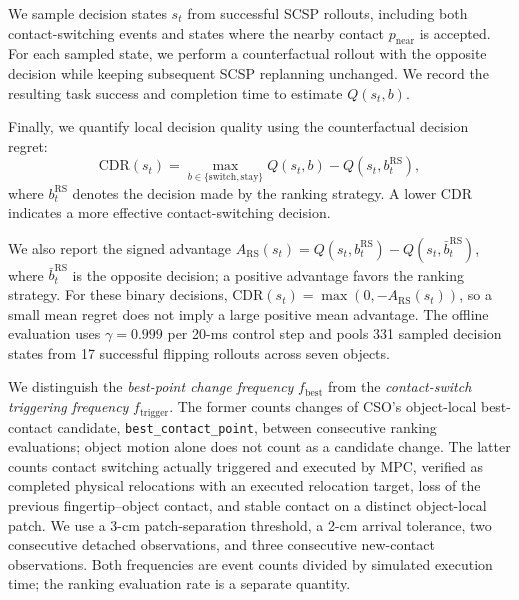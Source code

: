 We sample decision states $s_t$ from successful SCSP rollouts, including both contact-switching events and states where the nearby contact $p_{\mathrm{near}}$ is accepted. For each sampled state, we perform a counterfactual rollout with the opposite decision while keeping subsequent SCSP replanning unchanged. We record the resulting task success and completion time to estimate $Q(s_t,b)$.

Finally, we quantify local decision quality using the counterfactual decision regret:
\begin{equation}
\mathrm{CDR}(s_t)=
\max_{b\in\{\mathrm{switch},\mathrm{stay}\}}Q(s_t,b)
-Q(s_t,b_t^{\mathrm{RS}}),
\end{equation}
where $b_t^{\mathrm{RS}}$ denotes the decision made by the ranking strategy. A lower CDR indicates a more effective contact-switching decision.

We also report the signed advantage $A_{\mathrm{RS}}(s_t)=Q(s_t,b_t^{\mathrm{RS}})-Q(s_t,\bar b_t^{\mathrm{RS}})$, where $\bar b_t^{\mathrm{RS}}$ is the opposite decision; a positive advantage favors the ranking strategy. For these binary decisions, $\mathrm{CDR}(s_t)=\max(0,-A_{\mathrm{RS}}(s_t))$, so a small mean regret does not imply a large positive mean advantage. The offline evaluation uses $\gamma=0.999$ per 20-ms control step and pools 331 sampled decision states from 17 successful flipping rollouts across seven objects.

We distinguish the \emph{best-point change frequency} $f_{\mathrm{best}}$ from the \emph{contact-switch triggering frequency} $f_{\mathrm{trigger}}$. The former counts changes of CSO's object-local best-contact candidate, \texttt{best\_contact\_point}, between consecutive ranking evaluations; object motion alone does not count as a candidate change. The latter counts contact switching actually triggered and executed by MPC, verified as completed physical relocations with an executed relocation target, loss of the previous fingertip--object contact, and stable contact on a distinct object-local patch. We use a 3-cm patch-separation threshold, a 2-cm arrival tolerance, two consecutive detached observations, and three consecutive new-contact observations. Both frequencies are event counts divided by simulated execution time; the ranking evaluation rate is a separate quantity.

